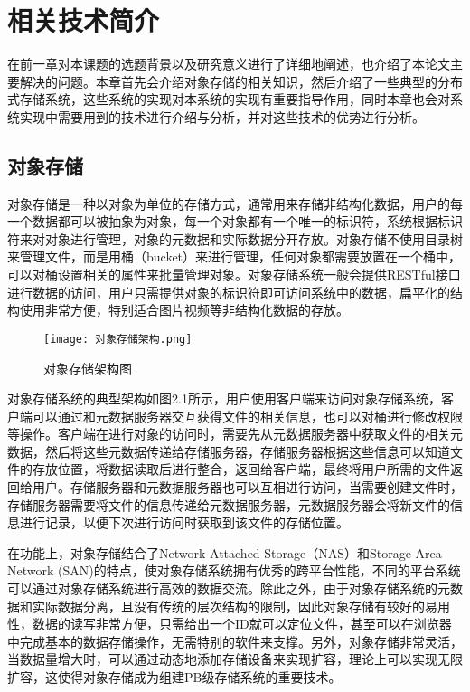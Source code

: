 
\chapter{相关技术简介}
在前一章对本课题的选题背景以及研究意义进行了详细地阐述，也介绍了本论文主要解决的问题。本章首先会介绍对象存储的相关知识，然后介绍了一些典型的分布式存储系统，这些系统的实现对本系统的实现有重要指导作用，同时本章也会对系统实现中需要用到的技术进行介绍与分析，并对这些技术的优势进行分析。
\section{对象存储}%
对象存储是一种以对象为单位的存储方式，通常用来存储非结构化数据，用户的每一个数据都可以被抽象为对象，每一个对象都有一个唯一的标识符，系统根据标识符来对对象进行管理，对象的元数据和实际数据分开存放。对象存储不使用目录树来管理文件，而是用桶（bucket）来进行管理，任何对象都需要放置在一个桶中，可以对桶设置相关的属性来批量管理对象。对象存储系统一般会提供RESTful接口进行数据的访问，用户只需提供对象的标识符即可访问系统中的数据，扁平化的结构使用非常方便，特别适合图片视频等非结构化数据的存放。
\begin{figure}
    \centering
    \texttt{[image: 对象存储架构.png]}
    \caption{对象存储架构图}
\end{figure}

对象存储系统的典型架构如图2.1所示，用户使用客户端来访问对象存储系统，客户端可以通过和元数据服务器交互获得文件的相关信息，也可以对桶进行修改权限等操作。客户端在进行对象的访问时，需要先从元数据服务器中获取文件的相关元数据，然后将这些元数据传递给存储服务器，存储服务器根据这些信息可以知道文件的存放位置，将数据读取后进行整合，返回给客户端，最终将用户所需的文件返回给用户。存储服务器和元数据服务器也可以互相进行访问，当需要创建文件时，存储服务器需要将文件的信息传递给元数据服务器，元数据服务器会将新文件的信息进行记录，以便下次进行访问时获取到该文件的存储位置。

在功能上，对象存储结合了Network Attached Storage\cite{33}（NAS）和Storage Area Network\cite{34} (SAN)的特点，使对象存储系统拥有优秀的跨平台性能\cite{35}，不同的平台系统可以通过对象存储系统进行高效的数据交流。除此之外，由于对象存储系统的元数据和实际数据分离，且没有传统的层次结构的限制，因此对象存储有较好的易用性，数据的读写非常方便，只需给出一个ID就可以定位文件，甚至可以在浏览器中完成基本的数据存储操作，无需特别的软件来支撑。另外，对象存储非常灵活，当数据量增大时，可以通过动态地添加存储设备来实现扩容，理论上可以实现无限扩容，这使得对象存储成为组建PB级存储系统的重要技术。

